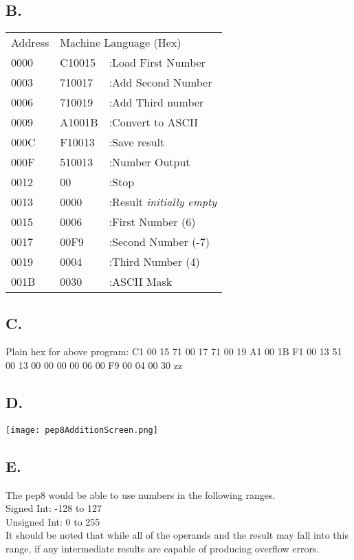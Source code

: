 \documentclass[a4paper,man,natbib]{apa6}
\begin{document}
\subsection{B.}
	\begin{tabular}{l l l}
		Address & \multicolumn{2}{l}{Machine Language (Hex)} \\ \cline{1-3}
		0000 & C10015 & :Load First Number \\
		0003 & 710017 & :Add Second Number \\
		0006 & 710019 & :Add Third number \\
		0009 & A1001B & :Convert to ASCII \\
		000C & F10013 & :Save result \\ 
		000F & 510013 & :Number Output \\
		0012 & 00 & :Stop \\
		0013 & 0000 & :Result \emph{initially empty} \\
		0015 & 0006 & :First Number (6)\\
		0017 & 00F9 & :Second Number (-7) \\
		0019 & 0004 & :Third Number (4) \\
		001B & 0030 & :ASCII Mask
	\end{tabular}
\subsection{C.}
Plain hex for above program:
C1 00 15 71 00 17 71 00 19 A1 00 1B F1 00 13 51 00 13 00 00 00 00 06 00 F9 00 04 00 30 zz
\subsection{D.}
	\begin{minipage}{\linewidth}
		\texttt{[image: pep8AdditionScreen.png]}
	\end{minipage}
\subsection{E.}
The pep8 would be able to use numbers in the following ranges. \\
Signed Int: -128 to 127 \\
Unsigned Int: 0 to 255 \\
It should be noted that while all of the operands and the result may fall into this range, if any intermediate results are capable of producing overflow errors.
\newpage

\end{document}
